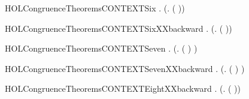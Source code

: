 \newcommand{\HOLCongruenceTheoremsCONTEXTFiveXXbackward}{\UseVerbatim{HOLCongruenceTheoremsCONTEXTFiveXXbackward}}
\begin{SaveVerbatim}{HOLCongruenceTheoremsCONTEXTSix}
\HOLTokenTurnstile{} \HOLSymConst{\HOLTokenForall{}} .   \HOLSymConst{\HOLTokenImp{}}  (\HOLTokenLambda{}. \HOLConst{\ensuremath{\nu}}  ( ))
\end{SaveVerbatim}
\newcommand{\HOLCongruenceTheoremsCONTEXTSix}{\UseVerbatim{HOLCongruenceTheoremsCONTEXTSix}}
\begin{SaveVerbatim}{HOLCongruenceTheoremsCONTEXTSixXXbackward}
\HOLTokenTurnstile{} \HOLSymConst{\HOLTokenForall{}} .  (\HOLTokenLambda{}. \HOLConst{\ensuremath{\nu}}  ( )) \HOLSymConst{\HOLTokenImp{}}  
\end{SaveVerbatim}
\newcommand{\HOLCongruenceTheoremsCONTEXTSixXXbackward}{\UseVerbatim{HOLCongruenceTheoremsCONTEXTSixXXbackward}}
\begin{SaveVerbatim}{HOLCongruenceTheoremsCONTEXTSeven}
\HOLTokenTurnstile{} \HOLSymConst{\HOLTokenForall{}} .   \HOLSymConst{\HOLTokenImp{}}  (\HOLTokenLambda{}.  ( ) )
\end{SaveVerbatim}
\newcommand{\HOLCongruenceTheoremsCONTEXTSeven}{\UseVerbatim{HOLCongruenceTheoremsCONTEXTSeven}}
\begin{SaveVerbatim}{HOLCongruenceTheoremsCONTEXTSevenXXbackward}
\HOLTokenTurnstile{} \HOLSymConst{\HOLTokenForall{}} .  (\HOLTokenLambda{}.  ( ) ) \HOLSymConst{\HOLTokenImp{}}  
\end{SaveVerbatim}
\newcommand{\HOLCongruenceTheoremsCONTEXTSevenXXbackward}{\UseVerbatim{HOLCongruenceTheoremsCONTEXTSevenXXbackward}}
\begin{SaveVerbatim}{HOLCongruenceTheoremsCONTEXTEightXXbackward}
\HOLTokenTurnstile{} \HOLSymConst{\HOLTokenForall{}} .  (\HOLTokenLambda{}.   ( )) \HOLSymConst{\HOLTokenImp{}}  
\end{SaveVerbatim}
